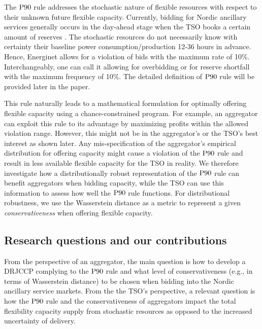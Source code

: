 \documentclass[conference]{IEEEtran}
\begin{document}
The $\rm{P90}$ rule addresses the stochastic nature of  flexible resources with respect to their unknown future flexible capacity. Currently, bidding for Nordic ancillary services generally occurs in the day-ahead stage when the \ac{TSO} books a certain amount of reserves \cite{energinet}. The stochastic resources do not necessarily know with certainty their baseline power consumption/production 12-36 hours in advance. Hence, Energinet allows for a violation of bids with the maximum rate of 10\%. Interchangeably, one can call it allowing for overbidding or for reserve shortfall with the maximum frequency of 10\%. The detailed definition of $\rm{P90}$ rule will be provided later in the paper. 

This rule naturally leads to a mathematical formulation for optimally offering flexible capacity using a chance-constrained program. For example, an aggregator can exploit this rule to its advantage by maximizing profits within the allowed violation range. However, this might not be in the aggregator's or the \ac{TSO}'s best interest as shown later. Any mis-specification of the aggregator's empirical distribution for offering  capacity might cause a violation of the $\rm{P90}$ rule and result in less available flexible capacity for the \ac{TSO} in reality. We therefore investigate how a distributionally robust representation of the $\rm{P90}$ rule can benefit aggregators when bidding capacity, while the \ac{TSO} can use this information to assess how well the $\rm{P90}$ rule functions. For distributional robustness, we use the Wasserstein distance as a metric to represent a given \textit{conservativeness} when offering flexible capacity.

\vspace{2mm}
\subsection{Research questions and our contributions}
\vspace{-1mm}
From the perspective of an aggregator, the main question is how to develop a DRJCCP complying to the $\rm{P90}$ rule and what level of conservativeness (e.g., in terms of Wasserstein distance) to be chosen when bidding into the Nordic ancillary service markets. From the the \ac{TSO}'s perspective, a relevant question is 
how the $\rm{P90}$ rule and the conservativeness of aggregators impact the total flexibility capacity supply from stochastic resources as opposed to the increased uncertainty of delivery. %
\end{document}
